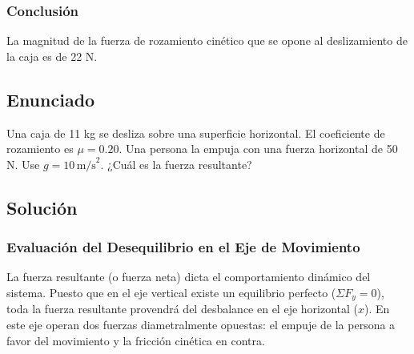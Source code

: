\documentclass[12pt]{article}
\begin{document}
\subsubsection*{Conclusión}
La magnitud de la fuerza de rozamiento cinético que se opone al deslizamiento de la caja es de 22 N.

\newpage

\subsection*{Enunciado}
Una caja de 11 kg se desliza sobre una superficie horizontal. El coeficiente de rozamiento es $\mu = 0.20$. Una persona la empuja con una fuerza horizontal de 50 N. Use $g = 10 \, \text{m/s}^2$. ¿Cuál es la fuerza resultante?

\begin{center}
\end{center}

\subsection*{Solución}

\subsubsection*{Evaluación del Desequilibrio en el Eje de Movimiento}
La fuerza resultante (o fuerza neta) dicta el comportamiento dinámico del sistema. Puesto que en el eje vertical existe un equilibrio perfecto ($\Sigma F_y = 0$), toda la fuerza resultante provendrá del desbalance en el eje horizontal ($x$). En este eje operan dos fuerzas diametralmente opuestas: el empuje de la persona a favor del movimiento y la fricción cinética en contra.
\end{document}

